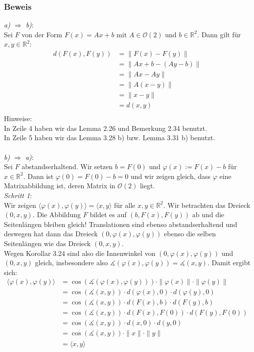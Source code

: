 \documentclass{article}
\begin{document}
\subsubsection*{Beweis}
\textit{a) $\Rightarrow$ b)}: \\
Sei $F$ von der Form $F(x)=Ax+b$ mit $A \in \mathcal{O}(2)$ und $b \in \mathbb{R}^2$. Dann gilt für $x,y \in \mathbb{R}^2$: \\
\begin{align*}
    d(F(x),F(y)) &= \|F(x)-F(y)\| \\
    &= \|Ax+b-(Ay-b)\| \\
    &= \|Ax-Ay\| \\
    &= \|A(x-y)\|\\
    &= \|x-y\| \\
    &= d(x,y) \\
\end{align*}
Hinweise: \\
In Zeile 4 haben wir das Lemma 2.26 und Bemerkung 2.34 benutzt. \\
In Zeile 5 haben wir das Lemma 3.28 b) bzw. Lemma 3.31 b) benutzt. \\
\\
\textit{b) $\Rightarrow$ a)}: \\
Sei $F$ abstandserhaltend. Wir setzen $b = F(0)$ und $\varphi(x) := F(x) - b$ für $x \in \mathbb{R}^2$. Dann ist $\varphi(0) = F(0) - b = 0$ und wir zeigen gleich, dass $\varphi$ eine Matrixabbildung ist, deren Matrix in $\mathcal{O}(2)$ liegt. \\
\textit{Schritt 1}: \\
Wir zeigen $\langle \varphi(x), \varphi(y) \rangle = \langle x,y \rangle$ für alle $x,y \in \mathbb{R}^2$. Wir betrachten das Dreieck $(0,x,y)$. Die Abbildung $F$ bildet es auf $(b, F(x), F(y))$ ab und die Seitenlängen bleiben gleich! Translationen sind ebenso abstandserhaltend und deswegen hat dann das Dreieck $(0,\varphi(x),\varphi(y))$ ebenso die selben Seitenlängen wie das Dreieck $(0,x,y)$. \\
Wegen Korollar 3.24 sind also die Innenwinkel von $(0,\varphi(x),\varphi(y))$ und $(0,x,y)$ gleich, insbesondere also $\measuredangle (\varphi(x),\varphi(y)) = \measuredangle (x,y)$. Damit ergibt sich: \\
\begin{align*}
    \langle \varphi(x), \varphi(y) \rangle &= \cos (\measuredangle (\varphi(x),\varphi(y))) \cdot \|\varphi(x)\| \cdot \|\varphi(y)\| \\
    &= \cos (\measuredangle (x,y)) \cdot d(\varphi(x),0) \cdot d(\varphi(y),0) \\
    &= \cos (\measuredangle (x,y)) \cdot d(F(x),b) \cdot d(F(y),b) \\
    &= \cos (\measuredangle (x,y)) \cdot d(F(x), F(0)) \cdot d(F(y), F(0)) \\
    &= \cos (\measuredangle (x,y)) \cdot d(x,0) \cdot d(y,0) \\
    &= \cos (\measuredangle (x,y)) \cdot \|x\| \cdot \|y\| \\
    &= \langle x,y \rangle \\
\end{align*}
\end{document}
